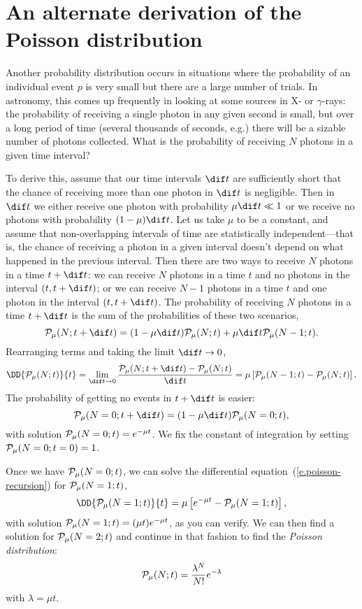 \section{An alternate derivation of the Poisson distribution}
Another probability distribution occurs in situations where the probability of an individual event $p$ is very small but there are a large number of trials.  In astronomy, this comes up frequently in looking at some sources in X- or $\gamma$-rays: the probability of receiving a single photon in any given second is small, but over a long period of time (several thousands of seconds, e.g.) there will be a sizable number of photons collected.  What is the probability of receiving $N$ photons in a given time interval?

To derive this, assume that our time intervals $\dif t$ are sufficiently short that the chance of receiving more than one photon in $\dif t$ is negligible.  Then in $\dif t$ we either receive one photon with probability $\mu\dif t \ll 1$ or we receive no photons with probability $(1-\mu)\dif t$.  Let us take $\mu$ to be a constant, and assume that non-overlapping intervals of time are statistically independent---that is, the chance of receiving a photon in a given interval doesn't depend on what happened in the previous interval.  Then there are two ways to receive $N$ photons in a time $t+\dif t$: we can receive $N$ photons in a time $t$ and no photons in the interval $(t,t+\dif t)$; or we can receive $N-1$ photons in a time $t$ and one photon in the interval $(t,t+\dif t)$.  The probability of receiving $N$ photons in a time $t+\dif t$ is the sum of the probabilities of these two scenarios,
\[
	\prob_{\mu}(N;t+\dif t) = (1-\mu\dif t)\prob_{\mu}(N;t) + \mu\dif t \prob_{\mu}(N-1;t).
\]
Rearranging terms and taking the limit $\dif t \to 0$,
\begin{equation}\label{e.poisson-recursion}
\DD{\prob_{\mu}(N;t)}{t} = \lim_{\dif t\to 0} \frac{\prob_{\mu}(N;t+\dif t)-\prob_{\mu}(N;t)}{\dif t} = \mu\left[\prob_{\mu}(N-1;t)-\prob_{\mu}(N;t)\right].
\end{equation}
The probability of getting no events in $t+\dif t$ is easier:
\[ \prob_{\mu}(N=0;t+\dif t) = (1-\mu\dif t)\prob_{\mu}(N=0;t), \]
with solution $\mathcal{P}_{\mu}(N=0;t) = e^{-\mu t}$.  We fix the constant of integration by setting $\mathcal{P}_{\mu}(N=0;t=0) = 1$.

Once we have $\mathcal{P}_{\mu}(N=0;t)$, we can solve the differential equation~(\ref{e.poisson-recursion}) for $\mathcal{P}_{\mu}(N=1;t)$,
\[ \DD{\prob_{\mu}(N=1;t)}{t} = \mu\left[e^{-\mu t} - \prob_{\mu}(N=1;t)\right], \]
with solution $\mathcal{P}_{\mu}(N=1;t) = (\mu t)e^{-\mu t}$, as you can verify.  We can then find a solution for $\mathcal{P}_{\mu}(N=2;t)$ and continue in that fashion to find the \emph{Poisson distribution}:
\begin{equation}\label{e.Poisson-alt}
	\mathcal{P}_{\mu}(N;t) = \frac{\lambda^{N}}{N!} e^{-\lambda}
\end{equation}
with $\lambda=\mu t$.

